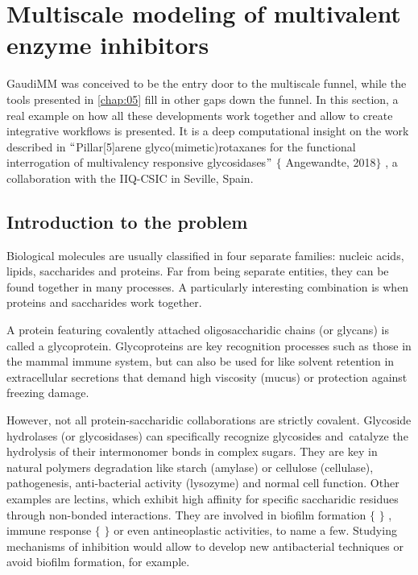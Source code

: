 \section{Multiscale modeling of multivalent enzyme inhibitors}
GaudiMM was conceived to be the entry door to the multiscale funnel, while the tools presented in \autoref{chap:05} fill in other gaps down the funnel. In this section, a real example on how all these developments work together and allow to create integrative workflows is presented. It is a deep computational insight on the work described in $``$Pillar[5]arene glyco(mimetic)rotaxanes for the functional interrogation of multivalency responsive glycosidases$"$  $ \{ $ Angewandte, 2018$ \} $ , a collaboration with the IIQ-CSIC in Seville, Spain.

\subsection{Introduction to the problem}
Biological molecules are usually classified in four separate families: nucleic acids, lipids, saccharides and proteins. Far from being separate entities, they can be found together in many processes. A particularly interesting combination is when proteins and saccharides work together.

A protein featuring covalently attached oligosaccharidic chains (or glycans) is called a glycoprotein. Glycoproteins are key recognition processes such as those in the mammal immune system, but can also be used for like solvent retention in extracellular secretions that demand high viscosity (mucus) or protection against freezing damage.

However, not all protein-saccharidic collaborations are strictly covalent. Glycoside hydrolases (or glycosidases) can specifically recognize glycosides and\ catalyze the hydrolysis of their intermonomer bonds in complex sugars.  They are key in natural polymers degradation like starch (amylase) or cellulose (cellulase), pathogenesis, anti-bacterial activity (lysozyme) and normal cell function. Other examples are lectins, which exhibit high affinity for specific saccharidic residues through non-bonded interactions. They are involved in biofilm formation $ \{ $ $ \} $ , immune response $ \{ $ $ \} $  or even antineoplastic activities,\cite{adwan2014} to name a few. Studying mechanisms of inhibition would allow to develop new antibacterial techniques or avoid biofilm formation, for example.

